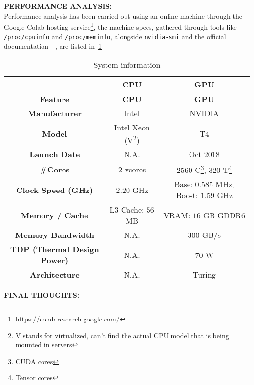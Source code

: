 \documentclass[a4paper,10pt]{article}
\begin{document}
\bigskip
{}
\makeatletter{}\makeatother\label{sec:performance-analysis}
\noindent
\textbf{PERFORMANCE ANALYSIS:}
\\
Performance analysis has been carried out using an online machine through the Google Colab hosting service\footnote{\url{https://colab.research.google.com/}}, the machine specs, gathered through tools like \texttt{/proc/cpuinfo} and \texttt{/proc/meminfo}, alongside \texttt{nvidia-smi} and the official documentation~\cite{t4-info}~\cite{t4-product-brief}, are listed in~\ref{tbl:system}
\begin{center}
	\begin{longtable}{c|c|c}
		\caption{System information}\label{tbl:system}\\\hline
		\textbf{} & \textbf{CPU} & \textbf{GPU} \\
		\hline\endfirsthead\hline
		\textbf{Feature} & \textbf{CPU} & \textbf{GPU} \\
		\hline\endhead\hline\endfoot\hline\endlastfoot
		
		\textbf{Manufacturer} & Intel & NVIDIA \\\hline

		\textbf{Model} & Intel Xeon (V\footnote{V stands for virtualized, can't find the actual CPU model that is being mounted in servers}) & T4 \\\hline
		\textbf{Launch Date} & N.A. & Oct 2018 \\\hline
		\textbf{\#Cores} & $2$ vcores  & $2560$ C\footnote{CUDA cores}, $320$ T\footnote{Tensor cores} \\\hline
		\textbf{Clock Speed (GHz)} & $2.20$ GHz & Base: $0.585$ MHz, Boost: $1.59$ GHz \\\hline
		\textbf{Memory / Cache} & L3 Cache: $56$ MB & VRAM: $16$ GB GDDR6 \\\hline
		\textbf{Memory Bandwidth} & N.A. & 300 GB/s \\\hline
		\textbf{TDP (Thermal Design Power)} & N.A. & $70$ W \\\hline
		\textbf{Architecture} & N.A. & Turing \\\hline
	\end{longtable}

\end{center}

\bigskip
{}
\makeatletter\def\@currentlabel{\texttt{(IV)}}\makeatother\label{sec:final-thoughts}
\noindent
\textbf{FINAL THOUGHTS:}
\\

\clearpage

\printbibliography
\end{document}
